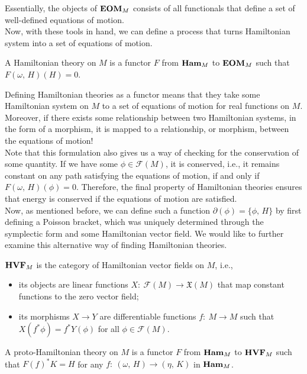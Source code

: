 \documentclass{article}
\newcommand{\category}[1]{{\normalfont\textbf{#1}}}
\begin{document}
\begin{multicols}{2}
\begin{equation}
	\end{equation}
	Essentially, the objects of \(\category{EOM}_M\) consists of all functionals that define a set of well-defined equations of motion.\\
	Now, with these tools in hand, we can define a process that turns Hamiltonian system into a set of equations of motion.
	\begin{definition}
		A Hamiltonian theory on \(M\) is a functor \(F\) from \(\category{Ham}_M\) to \(\category{EOM}_M\) such that \(F(\omega,\,H)(H) = 0\).
	\end{definition}
	Defining Hamiltonian theories as a functor means that they take some Hamiltonian system on \(M\) to a set of equations of motion for real functions on \(M\). 
	Moreover, if there exists some relationship between two Hamiltonian systems, in the form of a morphism, it is mapped to a relationship, or morphism, between the equations of motion!\\
	Note that this formulation also gives us a way of checking for the conservation of some quantity. If we have some \(\phi\in\mathcal{F}(M)\), it is conserved, i.e., it remains constant on any path satisfying the equations of motion, if and only if \(F(\omega,\,H)(\phi) = 0\).
	Therefore, the final property of Hamiltonian theories ensures that energy is conserved if the equations of motion are satisfied.\\
	Now, as mentioned before, we can define such a function \(\partial(\phi) = \{\phi,\,H\}\) by first defining a Poisson bracket, which was uniquely determined through the symplectic form and some Hamiltonian vector field. We would like to further examine this alternative way of finding Hamiltonian theories.
	\begin{definition}
		\(\category{HVF}_M\) is the category of Hamiltonian vector fields on \(M\), i.e.,
		\begin{itemize}
			\item its objects are linear functions \(X:\ \mathcal{F}(M)\to \mathfrak{X}(M)\) that map constant functions to the zero vector field;
			\item its morphisms \(X\to Y\) are differentiable functions \(f:\ M\to M\) such that \(X(f^*\phi) = f^*Y(\phi)\) for all \(\phi\in\mathcal{F}(M)\).
		\end{itemize}
	\end{definition}
	\begin{definition}
		A proto-Hamiltonian theory on \(M\) is a functor \(F\) from \(\category{Ham}_M\) to \(\category{HVF}_M\) such that \(F(f)^*K = H\) for any \(f:\ (\omega,\,H)\to(\eta,\,K)\) in \(\category{Ham}_M\).

\end{definition}
\end{multicols}
\end{document}
